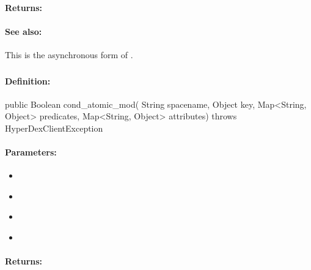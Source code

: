 \paragraph{Returns:}


\paragraph{See also:}  This is the asynchronous form of .

\pagebreak
\subsubsection{}
\label{api:java:cond_atomic_mod}


\paragraph{Definition:}
\begin{javacode}
public Boolean cond_atomic_mod(
        String spacename,
        Object key,
        Map<String, Object> predicates,
        Map<String, Object> attributes) throws HyperDexClientException
\end{javacode}

\paragraph{Parameters:}
\begin{itemize}[noitemsep]
\item {}\\

\item {}\\

\item {}\\

\item {}\\

\end{itemize}

\paragraph{Returns:}


